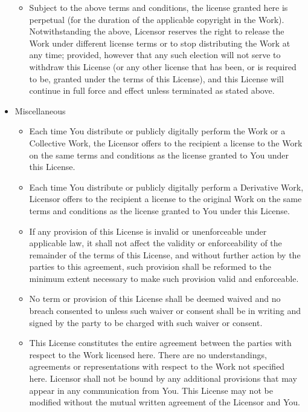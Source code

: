 \begin{itemize}
\begin{itemize}
\item Subject to the above terms and conditions, the license granted
here is perpetual (for the duration of the applicable copyright in the
Work).  Notwithstanding the above, Licensor reserves the right to
release the Work under different license terms or to stop distributing
the Work at any time; provided, however that any such election will
not serve to withdraw this License (or any other license that has
been, or is required to be, granted under the terms of this License),
and this License will continue in full force and effect unless
terminated as stated above.  \end{itemize} \item Miscellaneous
\begin{itemize} \item Each time You distribute or publicly digitally
perform the Work or a Collective Work, the Licensor offers to the
recipient a license to the Work on the same terms and conditions as
the license granted to You under this License.

\item Each time You distribute or publicly digitally perform a
Derivative Work, Licensor offers to the recipient a license to the
original Work on the same terms and conditions as the license granted
to You under this License.

\item If any provision of this License is invalid or unenforceable
under applicable law, it shall not affect the validity or
enforceability of the remainder of the terms of this License, and
without further action by the parties to this agreement, such
provision shall be reformed to the minimum extent necessary to make
such provision valid and enforceable.

\item No term or provision of this License shall be deemed waived and
no breach consented to unless such waiver or consent shall be in
writing and signed by the party to be charged with such waiver or
consent.

\item This License constitutes the entire agreement between the parties
with respect to the Work licensed here.  There are no understandings,
agreements or representations with respect to the Work not specified
here.  Licensor shall not be bound by any additional provisions that
may appear in any communication from You.  This License may not be
modified without the mutual written agreement of the Licensor and
You.\end{itemize} \end{itemize}


